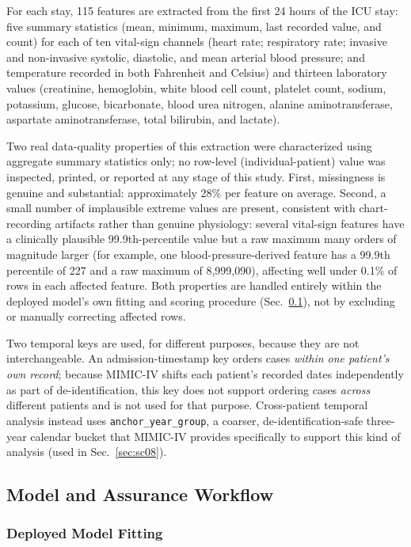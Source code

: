 \documentclass[preprintsapa,article,submit,oneauthor]{Definitions/mdpi}
\begin{document}
For each stay, 115 features are extracted from the first 24 hours of the ICU stay: five summary statistics (mean, minimum, maximum, last recorded value, and count) for each of ten vital-sign channels (heart rate; respiratory rate; invasive and non-invasive systolic, diastolic, and mean arterial blood pressure; and temperature recorded in both Fahrenheit and Celsius) and thirteen laboratory values (creatinine, hemoglobin, white blood cell count, platelet count, sodium, potassium, glucose, bicarbonate, blood urea nitrogen, alanine aminotransferase, aspartate aminotransferase, total bilirubin, and lactate).

Two real data-quality properties of this extraction were characterized using aggregate summary statistics only; no row-level (individual-patient) value was inspected, printed, or reported at any stage of this study. First, missingness is genuine and substantial: approximately 28\% per feature on average. Second, a small number of implausible extreme values are present, consistent with chart-recording artifacts rather than genuine physiology: several vital-sign features have a clinically plausible 99.9th-percentile value but a raw maximum many orders of magnitude larger (for example, one blood-pressure-derived feature has a 99.9th percentile of 227 and a raw maximum of 8{,}999{,}090), affecting well under 0.1\% of rows in each affected feature. Both properties are handled entirely within the deployed model's own fitting and scoring procedure (Sec.~\ref{sec:model}), not by excluding or manually correcting affected rows.

Two temporal keys are used, for different purposes, because they are not interchangeable. An admission-timestamp key orders cases \emph{within one patient's own record}; because MIMIC-IV shifts each patient's recorded dates independently as part of de-identification, this key does not support ordering cases \emph{across} different patients and is not used for that purpose. Cross-patient temporal analysis instead uses \texttt{anchor\_year\_group}, a coarser, de-identification-safe three-year calendar bucket that MIMIC-IV provides specifically to support this kind of analysis (used in Sec.~\ref{sec:sc08}).

\subsection{Model and Assurance Workflow}\label{sec:model}

\subsubsection{Deployed Model Fitting}
\end{document}
